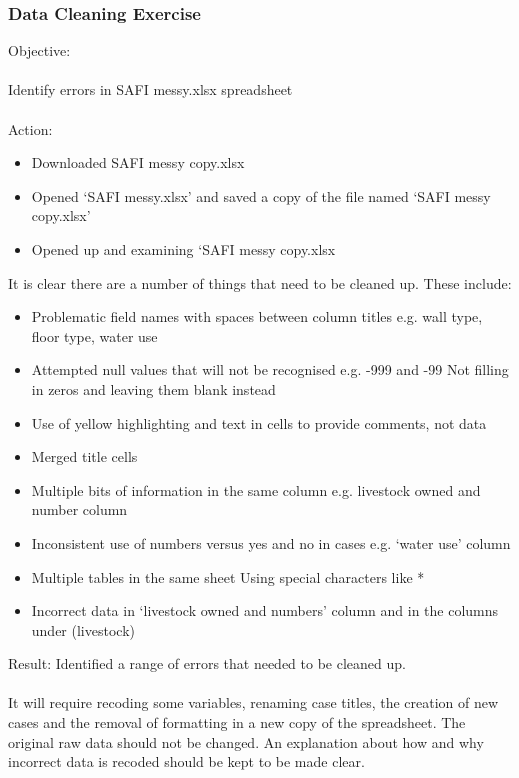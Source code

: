 \documentclass{article}
\begin{document}
\subsubsection*{Data Cleaning Exercise}
Objective:\\
\\Identify errors in SAFI messy.xlsx spreadsheet\\
\\
Action:
\begin{itemize}
\item Downloaded SAFI messy copy.xlsx
\item Opened ‘SAFI messy.xlsx’ and saved a copy of the file named ‘SAFI messy copy.xlsx’
\item Opened up and examining ‘SAFI messy copy.xlsx
\end{itemize}
It is clear there are a number of things that need to be cleaned up. These include:\par
\begin{itemize}
\item Problematic field names with spaces between column titles e.g. wall type, floor type, water use
\item Attempted null values that will not be recognised e.g. -999 and -99 
Not filling in zeros and leaving them blank instead
\item Use of yellow highlighting and text in cells to provide comments, not data
\item Merged title cells
\item Multiple bits of information in the same column e.g. livestock owned and number column
\item Inconsistent use of numbers versus yes and no in cases e.g. ‘water use’ column
\item Multiple tables in the same sheet
Using special characters like *
\item Incorrect data in ‘livestock owned and numbers’ column and in the columns under (livestock)
\end{itemize}
Result: Identified a range of errors that needed to be cleaned up.\\
\\
It will require recoding some variables, renaming case titles, the creation of new cases and the removal of formatting in a new copy of the spreadsheet. The original raw data should not be changed. An explanation about how and why incorrect data is recoded should be kept to be made clear.\\
\\
\end{document}
